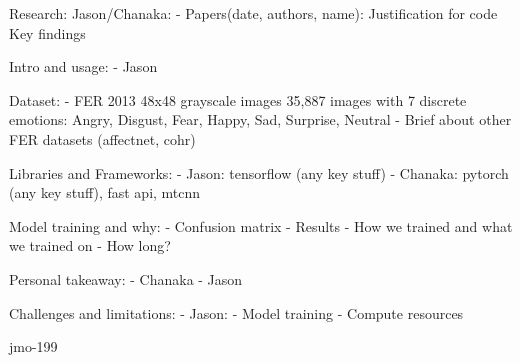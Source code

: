 Research:
Jason/Chanaka:
- Papers(date, authors, name):
	Justification for code
	Key findings

Intro and usage:
- Jason

Dataset:
- FER 2013
	48x48 grayscale images
	35,887 images with 7 discrete emotions: Angry, Disgust, Fear, Happy, Sad, Surprise, Neutral
- Brief about other FER datasets (affectnet, cohr)

Libraries and Frameworks:
- Jason: tensorflow (any key stuff)
- Chanaka: pytorch (any key stuff), fast api, mtcnn
	
Model training and why:
- Confusion matrix
- Results
- How we trained and what we trained on  
- How long?

Personal takeaway:
- Chanaka 
- Jason 

Challenges and limitations:
- Jason: 
- Model training
- Compute resources


jmo-199